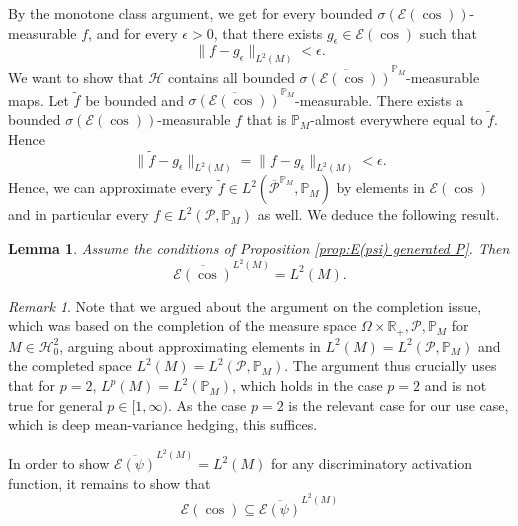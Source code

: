 \documentclass[11pt,a4paper,twoside,openany]{report}
\numberwithin{equation}{section}
\theoremstyle{plain} %
\newtheorem{lemma}[theorem]{Lemma}
\theoremstyle{definition} %
\theoremstyle{remark} %
\newtheorem{remark}[theorem]{Remark}
\begin{document}
By the monotone class argument, we get for every bounded \(\sigma(\mathcal{E}(\cos))\)-measurable \(f\), and for every \(\epsilon>0\), that there exists \(g_{\epsilon}\in \mathcal{E}(\cos)\) such that 
 \begin{equation*}
     \lVert f-g_{\epsilon}\rVert_{L^2(M)}<\epsilon.
 \end{equation*}
 We want to show that \(\mathcal{H}\) contains all bounded \(\overline{\sigma(\mathcal{E}(\cos))}^{\mathbb{P}_M}\)-measurable maps. Let \(\widetilde{f}\) be bounded and \(\overline{\sigma(\mathcal{E}(\cos))}^{\mathbb{P}_M}\)-measurable. There exists a bounded \(\sigma(\mathcal{E}(\cos))\)-measurable \(f\) that is \(\mathbb{P}_M\)-almost everywhere equal to \(\widetilde{f}\). Hence 
 \begin{equation*}
     \lVert \widetilde{f}-g_{\epsilon}\rVert_{L^2(M)}=\lVert f-g_{\epsilon}\rVert_{L^2(M)}<\epsilon.
 \end{equation*}
 Hence, we can approximate every \(\widetilde{f}\in L^2(\overline{\mathcal{P}}^{\mathbb{P}_M},\mathbb{P}_M)\) by elements in \(\mathcal{E}(\cos)\) and in particular every \(f\in L^2(\mathcal{P},\mathbb{P}_M)\) as well. We deduce the following result.
\begin{lemma}\label{lemma:density of E(cos) in L2(M)}
Assume the conditions of Proposition \ref{prop:E(psi) generated P}. Then 
\begin{equation*}
    \overline{\mathcal{E}(\cos)}^{L^2(M)}=L^2(M).
\end{equation*}
\end{lemma}
\begin{remark}
    Note that we argued about the argument on the completion issue, which was based on the completion of the measure space \(\Omega\times\mathbb{R}_+,\mathcal{P},\mathbb{P}_M\) for \(M\in\mathcal{H}^2_0\), arguing about approximating elements in \(L^2(M)=L^2(\mathcal{P},\mathbb{P}_M)\) and the completed space \(L^2(M)=L^2(\mathcal{P},\mathbb{P}_M)\).
    The argument thus crucially uses that for \(p=2\), \(L^p(M)=L^2(\mathbb{P}_M)\), which holds in the case \(p=2\) and is not true for general \(p\in [1,\infty)\). As the case \(p=2\) is the relevant case for our use case, which is deep mean-variance hedging, this suffices.
\end{remark}
In order to show \(\overline{\mathcal{E}(\psi)}^{L^2(M)}=L^2(M)\) for any discriminatory activation function, it remains to show that
\begin{equation*}
    \mathcal{E}(\cos)\subseteq \overline{\mathcal{E}(\psi)}^{L^2(M)}
\end{equation*}
\end{document}
